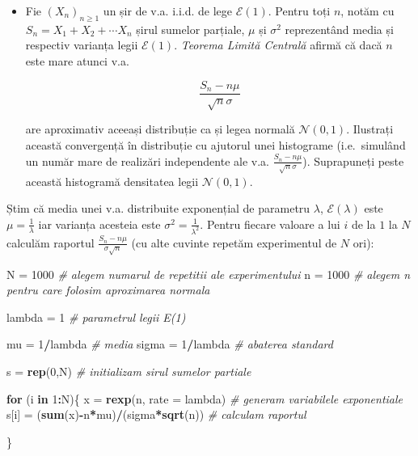 \documentclass[]{article}
\newenvironment{Shaded}{\begin{snugshade}}{\end{snugshade}}
\newcommand{\CommentTok}[1]{\textcolor[rgb]{0.56,0.35,0.01}{\textit{#1}}}
\newcommand{\ControlFlowTok}[1]{\textcolor[rgb]{0.13,0.29,0.53}{\textbf{#1}}}
\newcommand{\DataTypeTok}[1]{\textcolor[rgb]{0.13,0.29,0.53}{#1}}
\newcommand{\DecValTok}[1]{\textcolor[rgb]{0.00,0.00,0.81}{#1}}
\newcommand{\KeywordTok}[1]{\textcolor[rgb]{0.13,0.29,0.53}{\textbf{#1}}}
\newcommand{\NormalTok}[1]{#1}
\newcommand{\OperatorTok}[1]{\textcolor[rgb]{0.81,0.36,0.00}{\textbf{#1}}}
\newcommand{\StringTok}[1]{\textcolor[rgb]{0.31,0.60,0.02}{#1}}
\newenvironment{frshaded*}{%
  \def\FrameCommand{\fboxrule=\FrameRule\fboxsep=\FrameSep \fcolorbox{framecolor}{shadecolor1}}%
  \MakeFramed {\advance\hsize-\width \FrameRestore}}%
{\endMakeFramed}
\newenvironment{rmdblock}[1]
  {\begin{frshaded*}
  \begin{itemize}
  \renewcommand{\labelitemi}{
    \raisebox{-.7\height}[0pt][0pt]{
      {\setkeys{Gin}{width=2em,keepaspectratio}\texttt{[image: images/icons/\#1]}}
    }
  }
  \item
  }
  {
  \end{itemize}
  \end{frshaded*}
  }
\newenvironment{rmdexercise}
  {\begin{rmdblock}{exercise}}
  {\end{rmdblock}}
\begin{document}
\begin{rmdexercise}
Fie \((X_n)_{n\geq1}\) un șir de v.a. i.i.d. de lege \(\mathcal{E}(1)\).
Pentru toți \(n\), notăm cu \(S_n=X_1+X_2+\cdots X_n\) șirul sumelor
parțiale, \(\mu\) și \(\sigma^2\) reprezentând media și respectiv
varianța legii \(\mathcal{E}(1)\). \emph{Teorema Limită Centrală} afirmă
că dacă \(n\) este mare atunci v.a.

\[
\frac{S_n-n\mu}{\sqrt{n}\sigma}
\]

are aproximativ aceeași distribuție ca și legea normală
\(\mathcal{N}(0,1)\). Ilustrați această convergență în distribuție cu
ajutorul unei histograme (i.e.~simulând un număr mare de realizări
independente ale v.a. \(\frac{S_n-n\mu}{\sqrt{n}\sigma}\)). Suprapuneți
peste această histogramă densitatea legii \(\mathcal{N}(0,1)\).
\end{rmdexercise}

Știm că media unei v.a. distribuite exponențial de parametru
\(\lambda\), \(\mathcal{E}(\lambda)\) este \(\mu=\frac{1}{\lambda}\) iar
varianța acesteia este \(\sigma^2=\frac{1}{\lambda^2}\). Pentru fiecare
valoare a lui \(i\) de la \(1\) la \(N\) calculăm raportul
\(\frac{S_n-n\mu}{\sigma\sqrt{n}}\) (cu alte cuvinte repetăm
experimentul de \(N\) ori):

\begin{Shaded}
\begin{Highlighting}[]
\NormalTok{N =}\StringTok{ }\DecValTok{1000} \CommentTok{# alegem numarul de repetitii ale experimentului}
\NormalTok{n =}\StringTok{ }\DecValTok{1000} \CommentTok{# alegem n pentru care folosim aproximarea normala}

\NormalTok{lambda =}\StringTok{ }\DecValTok{1} \CommentTok{# parametrul legii E(1)}

\NormalTok{mu =}\StringTok{ }\DecValTok{1}\OperatorTok{/}\NormalTok{lambda }\CommentTok{# media}
\NormalTok{sigma =}\StringTok{ }\DecValTok{1}\OperatorTok{/}\NormalTok{lambda }\CommentTok{# abaterea standard }

\NormalTok{s =}\StringTok{ }\KeywordTok{rep}\NormalTok{(}\DecValTok{0}\NormalTok{,N) }\CommentTok{# initializam sirul sumelor partiale}

\ControlFlowTok{for}\NormalTok{ (i }\ControlFlowTok{in} \DecValTok{1}\OperatorTok{:}\NormalTok{N)\{}
\NormalTok{  x =}\StringTok{ }\KeywordTok{rexp}\NormalTok{(n, }\DataTypeTok{rate =}\NormalTok{ lambda) }\CommentTok{# generam variabilele exponentiale}
\NormalTok{  s[i] =}\StringTok{ }\NormalTok{(}\KeywordTok{sum}\NormalTok{(x)}\OperatorTok{-}\NormalTok{n}\OperatorTok{*}\NormalTok{mu)}\OperatorTok{/}\NormalTok{(sigma}\OperatorTok{*}\KeywordTok{sqrt}\NormalTok{(n)) }\CommentTok{# calculam raportul }
  
\NormalTok{\}}
\end{Highlighting}
\end{Shaded}
\end{document}
